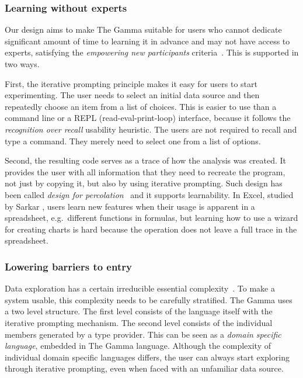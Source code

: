\documentclass[conference]{IEEEtran}
\begin{document}
\vspace{0.5em}
\subsubsection*{Learning without experts}
Our design aims to make The Gamma suitable for users who cannot dedicate significant amount of time
to learning it in advance and may not have access to experts, satisfying the \emph{empowering new
participants} criteria~\cite{evaluating}. This is supported in two ways.

First, the iterative prompting principle makes it easy for users to start experimenting.
The user needs to select an initial data source and then repeatedly choose an
item from a list of choices. This is easier to use than a command line or a REPL
(read-eval-print-loop) interface, because it follows the \emph{recognition over recall} usability heuristic.
The users are not required to recall and type a command. They merely need to select one from a
list of options.

Second, the resulting code serves as a trace of how the analysis was
created. It provides the user with all information that they need to recreate the
program, not just by copying it, but also by using iterative prompting. Such design
has been called \emph{design for percolation}~\cite{learning} and it supports learnability.
In Excel, studied by Sarkar \cite{learning}, users learn new features when their usage is apparent
in a spreadsheet, e.g.~different functions in formulas, but learning how to use a wizard for
creating charts is hard because the operation does not leave a full trace in the spreadsheet.

\vspace{0.5em}
\subsubsection*{Lowering barriers to entry}

Data exploration has a certain irreducible essential complexity~\cite{silverbullet}. To make a system usable, this
complexity needs to be carefully stratified. The Gamma uses a two level structure. The first level
consists of the language itself with the iterative prompting mechanism. The second level consists of
the individual members generated by a type provider. This can be seen as a \emph{domain specific
language}, embedded in The Gamma language. Although the complexity of individual domain specific
languages differs, the user can always start exploring through iterative prompting, even when
faced with an unfamiliar data source.
\end{document}
